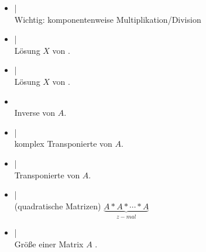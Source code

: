 \documentclass[hyperref={xetex}]{beamer}
\begin{document}
%
%
\begin{frame}[fragile]{}
\begin{itemize}
\item {} |  \isage{*,/}\\
\alert{Wichtig:} komponentenweise Multiplikation/Division 
\item {} |  \\ Lösung $X$ von . \\

\item {} | \\ Lösung $X$ von .\\

\item {}\\ Inverse von $A$.\\

\item {} | \\ komplex Transponierte von $A$. \\

\item {} |  \\ Transponierte von $A$. \\

\item {} |  \\ (quadratische Matrizen) $\underbrace{A*A*\cdots *A}_{z-mal}$ \\

\item {} | \\ Gr\"o{\ss}e einer Matrix $A$ . 
\end{itemize}
\end{frame}
\end{document}
